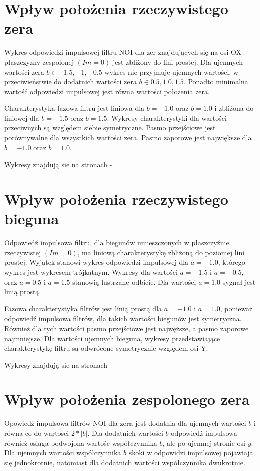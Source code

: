 \documentclass[wide,a4paper,titlepage,12pt]{mwart}
\begin{document}
  
	\section{Wpływ położenia rzeczywistego zera}
	Wykres odpowiedzi impulsowej filtru NOI dla zer znajdujących się na osi OX płaszczyzny zespolonej $(Im = 0)$ jest zbliżony do lini prostej. Dla ujemnych wartości zera $b \in {-1.5, -1, -0.5}$ wykres nie przyjmuje ujemnych wartości, w przeciwieństwie do dodatnich wartości zera $b \in {0.5, 1.0, 1.5}$. Ponadto minimalna wartość odpowiedzi impulsowej jest równa wartości położenia zera.
	
	Charakterystyka fazowa filtru jest liniowa dla $b = -1.0$ oraz $b = 1.0$ i zbliżona do liniowej dla $b = -1.5$ oraz $b= 1.5$. Wykresy charakterystyki dla wartości przeciwnych są względem siebie symetryczne. 
	Pasmo przejściowe jest porównywalne dla wszystkich wartości zera. Pasmo zaporowe jest największe dla  $b = -1.0$ oraz $b = 1.0$.
	
	Wykresy znajdują sie na stronach \pageref{fig1}-\pageref{fig7}
	
	\section{Wpływ położenia rzeczywistego bieguna}
	Odpowiedź impulsowa filtru, dla biegunów umieszczonych w płaszczyźnie rzeczywistej $(Im = 0)$, ma liniową charakterystykę zbliżoną do poziomej lini prostej. Wyjątek stanowi wykres odpowiedzi impulsowej dla $a = -1.0$, którego wykres jest wykresem trójkątnym. Wykresy dla wartości $a=-1.5$ i $a=-0.5$, oraz $a=0.5$ i $a=1.5$ stanowią lustrzane odbicie. Dla wartości $a=1.0$ sygnał jest linią prostą. 
	
	Fazowa charakterystyka filtrów jest linią prostą dla $a=-1.0$ i $a=1.0$, ponieważ odpowiedź impulsowa filtrów, dla takich wartości biegunów jest symetryczna. Również dla tych wartości pasmo przejściowe jest najwęższe, a pasmo zaporowe najmniejsze. Dla wartości ujemnych bieguna, wykresy przedstawiające charakterystykę filtru są odwrócone symetrycznie względem osi Y.
	
	Wykresy znajdują sie na stronach \pageref{fig8}-\pageref{fig14}
	
	
	\section{Wpływ położenia zespolonego zera}
	Opowiedź impulsowa filtrów NOI dla zera jest dodatnia dla ujemnych wartości $b$ i równa co do wartosci $2*|b|$. Dla dodatnich wartości $b$ odpowiedź impulsowa również osiąga podwojona wartośc współczynnika $b$, ale po ujemnej stronie osi $y$. Dla ujemnych wartości współczynnika $b$ skoki w odpowidzi impulsowej pojawiaja się jednokrotnie, natomiast dla dodatnich wartości współczynnika dwukrotnie. 
	
\end{document}
